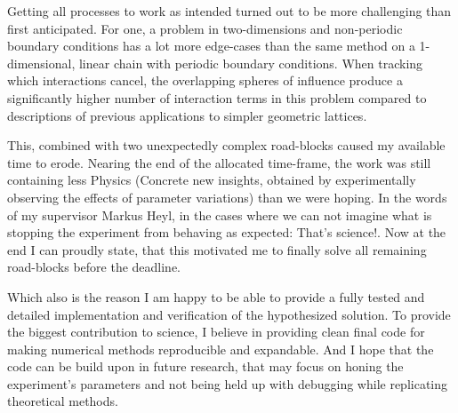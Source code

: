 Getting all processes to work as intended turned out to be more challenging than first anticipated.
For one, a problem in two-dimensions and non-periodic boundary conditions has a lot more edge-cases than the same method on a 1-dimensional, linear chain with periodic boundary conditions.
When tracking which interactions cancel, the overlapping \glqq spheres of influence\grqq{} produce a significantly higher number of interaction terms in this problem compared to descriptions of previous applications to simpler geometric lattices.

This, combined with two unexpectedly complex road-blocks caused my available time to erode.
Nearing the end of the allocated time-frame, the work was still containing less \glqq Physics\grqq{} (Concrete new insights, obtained by experimentally observing the effects of parameter variations) than we were hoping.
In the words of my supervisor Markus Heyl, in the cases where we can not imagine what is stopping the experiment from behaving as expected: \glqq That's science!\grqq{}.
Now at the end I can proudly state, that this motivated me to finally solve all remaining road-blocks before the deadline.

Which also is the reason I am happy to be able to provide a fully tested and detailed implementation and verification of the hypothesized solution.
To provide the biggest contribution to science, I believe in providing clean final code for making numerical methods reproducible and expandable.
And I hope that the code can be build upon in future research, that may focus on honing the experiment's parameters and not being held up with debugging while replicating theoretical methods.
